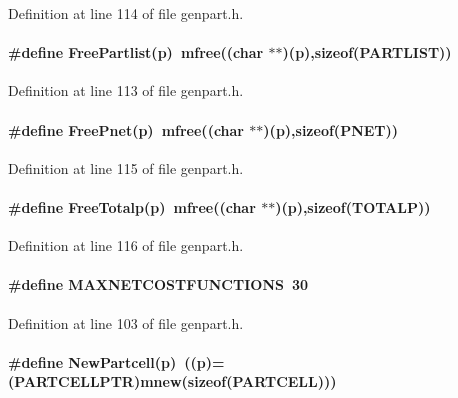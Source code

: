 Definition at line 114 of file genpart.h.\label{genpart.h_a7}
\paragraph{\setlength{\rightskip}{0pt plus 5cm}\#define Free\-Partlist(p)\ mfree((char $\ast$$\ast$)(p),sizeof({\bf PARTLIST}))}\hfill



Definition at line 113 of file genpart.h.\label{genpart.h_a9}
\paragraph{\setlength{\rightskip}{0pt plus 5cm}\#define Free\-Pnet(p)\ mfree((char $\ast$$\ast$)(p),sizeof({\bf PNET}))}\hfill



Definition at line 115 of file genpart.h.\label{genpart.h_a10}
\paragraph{\setlength{\rightskip}{0pt plus 5cm}\#define Free\-Totalp(p)\ mfree((char $\ast$$\ast$)(p),sizeof({\bf TOTALP}))}\hfill



Definition at line 116 of file genpart.h.\label{genpart.h_a0}
\paragraph{\setlength{\rightskip}{0pt plus 5cm}\#define MAXNETCOSTFUNCTIONS\ 30}\hfill



Definition at line 103 of file genpart.h.\label{genpart.h_a1}
\paragraph{\setlength{\rightskip}{0pt plus 5cm}\#define New\-Partcell(p)\ ((p)=({\bf PARTCELLPTR})mnew(sizeof({\bf PARTCELL})))}\hfill



